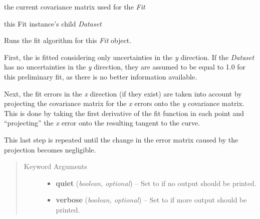 \documentclass[a4paper,10pt,english]{sphinxmanual}
\begin{document}
\begin{fulllineitems}
\begin{fulllineitems}
\end{fulllineitems}


\begin{fulllineitems}
\label{index:kafe.fit.Fit.current_cov_mat}
the current covariance matrix used for the \emph{Fit}

\end{fulllineitems}


\begin{fulllineitems}
\label{index:kafe.fit.Fit.dataset}
this Fit instance's child \emph{Dataset}

\end{fulllineitems}


\begin{fulllineitems}
\label{index:kafe.fit.Fit.do_fit}
Runs the fit algorithm for this \emph{Fit} object.

First, the  is fitted considering only uncertainties
in the
\emph{y} direction. If the \emph{Dataset} has no uncertainties in the \emph{y}
direction, they are assumed to be equal to 1.0 for this preliminary
fit, as there is no better information available.

Next, the fit errors in the \emph{x} direction (if they exist) are taken
into account by projecting the covariance matrix for the \emph{x} errors
onto the \emph{y} covariance matrix. This is done by taking the first
derivative of the fit function in each point and ``projecting'' the \emph{x}
error onto the resulting tangent to the curve.

This last step is repeated until the change in the error matrix caused
by the projection becomes negligible.
\begin{quote}\begin{description}
\item[{Keyword Arguments}] \leavevmode\begin{itemize}
\item {} 
\textbf{quiet} (\emph{boolean, optional}) --
Set to  if no output should be printed.

\item {} 
\textbf{verbose} (\emph{boolean, optional}) --
Set to  if more output should be printed.


\end{itemize}
\end{description}
\end{quote}
\end{fulllineitems}
\end{fulllineitems}
\end{document}
